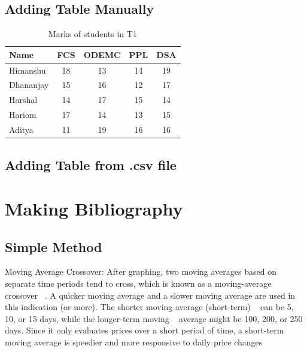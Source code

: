 \documentclass[12pt]{article}
\begin{document}
\subsection{Adding Table Manually}
\begin{table}[h]
\begin{center}
\caption{Marks of students in T1}
\label{tab:Table 1} 
\vspace{5mm}
\begin{tabular}{|p{2cm}|c|c|c|c|}
\hline
\textbf{Name} & \textbf{FCS} & \textbf{ODEMC} & \textbf{PPL} & 				\textbf{DSA}\\
\hline
Himanshu  & 18 & 13 & 14 & 19\\
Dhananjay & 15 & 16 & 12 & 17\\
Harshal & 14 & 17 & 15 & 14\\
Hariom & 17 & 14 & 13 & 15\\
Aditya & 11 & 19 & 16 & 16\\
\hline
\end{tabular}
\end{center}	
\end{table}


\subsection{Adding Table from .csv file}
\begin{table}[h]
\centering
{}
\end{table}

\newpage
\section{ Making Bibliography}
\subsection{Simple Method}
Moving Average Crossover: After graphing, two 
moving averages based on separate time periods tend to cross, 
which is known as a moving-average crossover ~\cite{Paper}. A quicker 
moving average and a slower moving average are used in this 
indication (or more). The shorter moving average (short-term) ~\cite{Latex}
can be 5, 10, or 15 days, while the longer-term moving ~\cite{aa,agarwal}
average might be 100, 200, or 250 days. Since it only 
evaluates prices over a short period of time, a short-term 
moving average is speedier and more responsive to daily 
price changes ~\cite{agarwal,Kshir,rucha}
\end{document}

